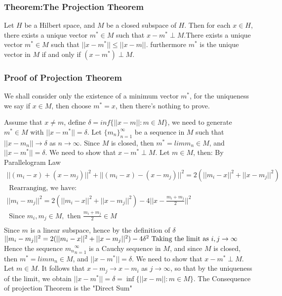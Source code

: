 \documentclass[12pt]{article}
\begin{document}
\subsubsection*{Theorem:The Projection Theorem}
Let $H$ be a Hilbert space, and $M$ be a closed subspace of $H$. Then for each $x \in H$, there exists a unique vector $m^* \in M$ such that $x-m^* \perp M$.There exists a unique vector $m^* \in M$ such that $||x-m^*|| \le ||x-m||$. furthermore $m^*$ is the unique vector in $M$ if and only if $(x-m^*) \perp M$.

\subsubsection*{Proof of Projection Theorem}
We shall consider only the existence of a minimum vector $m^*$, for the uniqueness we say if $x \in M$, then choose $m^* = x$, then there's nothing to prove.

Assume that $x \ne m$, define $\delta = inf\{||x-m||: m \in M\}$, we need to generate $m^* \in M$ with $||x-m^*|| = \delta$. Let $\{m_n\}_{n=1}^{\infty}$ be a sequence in $M$ such that $||x-m_n|| \to \delta$ as $n \to \infty$. Since $M$ is closed, then $m^* = lim m_n \in M$, and $||x-m^*|| = \delta$. We need to show that $x-m^* \perp M$. Let $m \in M$, then:
By Parallelogram Law
\begin{eqnarray*}
    ||(m_i - x) + (x- m_j)||^2 + ||(m_i - x) - (x- m_j)||^2 = 2(||m_i - x||^2 + ||x- m_j||^2) \\
    \text{ Rearranging, we have: } \\
    || m_i - m_j||^2 = 2(||m_i - x||^2 + ||x- m_j||^2) - 4||x - \frac{m_i + m_j}{2}||^2 \\
    \text{ Since } m_i, m_j \in M, \text{ then } \frac{m_i + m_j}{2} \in M \\   
\end{eqnarray*}
Since $m$ is a linear subspace, hence by the definition of $\delta$
\begin{math}
    ||m_i - m_j||^2 = 2(||m_i - x||^2 + ||x- m_j||^2) - 4\delta^2 \\
    \text{ Taking the limit as } i,j \to \infty
\end{math}
Hence the sequence ${m_n}^{\infty}_{n=1}$ is a Cauchy sequence in $M$, and since $M$ is closed, then $m^* = lim m_n \in M$, and $||x-m^*|| = \delta$. We need to show that $x-m^* \perp M$. Let $m \in M$. It follows that $x-m_j \to x-m_i$ as $j \to \infty$, so that by the uniqueness of the limit, we obtain $||x-m^*|| = \delta = \inf\{||x-m||: m \in M\}$.
\newline
The Consequence of projection Theorem is the "Direct Sum"
\end{document}
